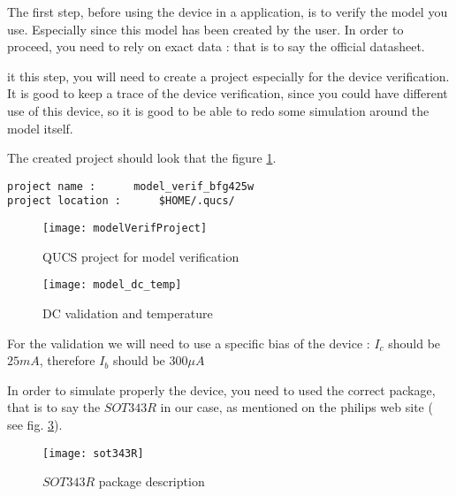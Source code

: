 
The first step, before using the device in a application, is to verify the model you use. Especially since this model has been created by the user. In order to proceed, you need to rely on exact data : that is to say the official datasheet. 

it this step, you will need to create a project especially for the device verification. It is good to keep a trace of the device verification, since you could have different use of this device, so it is good to be able to redo some simulation around the model itself.

The created project should look that the figure \ref{design:pa:model:project}.

\begin{verbatim}
project name : 		model_verif_bfg425w
project location :		$HOME/.qucs/ 
\end{verbatim}

\begin{figure}[htbp]
\begin{center}
	\texttt{[image: modelVerifProject]}
	\caption{QUCS project for model verification}
	\label{design:pa:model:project}
\end{center}
\end{figure}

\begin{figure}[htbp]
\begin{center}
	\texttt{[image: model\_dc\_temp]}
	\caption{DC validation and temperature}
	\label{design:pa:model:dcTemp}
\end{center}
\end{figure}

For the validation we will need to use a specific bias of the device : $I_c$ should be $25 mA$, therefore $I_b$ should be $300 \mu A$


In order to simulate properly the device, you need to used the correct package, that is to say the $SOT343R$ in our case, as mentioned on the philips web site ( see fig. \ref{design:pa:model:sotDesc}).

\begin{figure}[htbp]
\begin{center}
	\texttt{[image: sot343R]}
	\caption{$SOT343R$ package description}
	\label{design:pa:model:sotDesc}
\end{center}
\end{figure}

